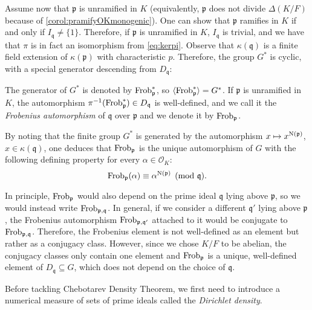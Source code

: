 \documentclass[../main.tex]{subfiles}
\begin{document}
Assume now that $\mathfrak{p}$ is unramified in $K$ (equivalently, $\mathfrak{p}$ does not divide $\Delta(K/F)$ because of \cref{corol:pramifyOKmonogenic}). One can show that $\mathfrak{p}$ ramifies in $K$ if and only if $I_\mathfrak{q}\neq\{1\}$. Therefore, if $\mathfrak{p}$ is unramified in $K$, $I_\mathfrak{q}$ is trivial, and we have that $\pi$ is in fact an isomorphism from \cref{eq:kerpi}. Observe that $\kappa(\mathfrak{q})$ is a finite field extension of $\kappa(\mathfrak{p})$ with characteristic $p$. Therefore, the group $G^*$ is cyclic, with a special generator descending from $D_\mathfrak{q}$:
\begin{definition}
	The generator of $G^*$ is denoted by $\operatorname{Frob}_{\mathfrak{p}}^*$, so $\langle\operatorname{Frob}_{\mathfrak{p}}^*\rangle=G^*$. If $\mathfrak{p}$ is unramified in $K$, the automorphism $\pi^{-1}(\operatorname{Frob}_{\mathfrak{p}}^*)\in D_\mathfrak{q}$ is well-defined, and we call it the \emph{Frobenius automorphism} of $\mathfrak{q}$ over $\mathfrak{p}$ and we denote it by $\operatorname{Frob}_{\mathfrak{p}}$.
\end{definition}
By noting that the finite group $G^*$ is generated by the automorphism $x\mapsto x^{\operatorname{N}(\mathfrak{p})}$, $x\in\kappa(\mathfrak{q})$, one deduces that $\operatorname{Frob}_{\mathfrak{p}}$ is the unique automorphism of $G$ with the following defining property for every $\alpha\in\mathcal{O}_K$:
\begin{equation*}
	\operatorname{Frob}_{\mathfrak{p}}(\alpha)\equiv \alpha^{\operatorname{N}(\mathfrak{p})} \pmod{\mathfrak{q}}.
\end{equation*}

\begin{remark}
	In principle, $\operatorname{Frob}_{\mathfrak{p}}$ would also depend on the prime ideal $\mathfrak{q}$ lying above $\mathfrak{p}$, so we would instead write $\operatorname{Frob}_{\mathfrak{p}, \mathfrak{q}}$. In general, if we consider a different $\mathfrak{q}'$ lying above $\mathfrak{p}$, the Frobenius automorphism $\operatorname{Frob}_{\mathfrak{p}, \mathfrak{q}'}$ attached to it would be conjugate to $\operatorname{Frob}_{\mathfrak{p}, \mathfrak{q}}$. Therefore, the Frobenius element is not well-defined as an element but rather as a conjugacy class. However, since we chose $K/F$ to be abelian, the conjugacy classes only contain one element and $\operatorname{Frob}_{\mathfrak{p}}$ is a unique, well-defined element of $D_\mathfrak{q}\subseteq G$, which does not depend on the choice of $\mathfrak{q}$.
\end{remark}

Before tackling Chebotarev Density Theorem, we first need to introduce a numerical measure of sets of prime ideals called the \emph{Dirichlet density}. 
\end{document}
